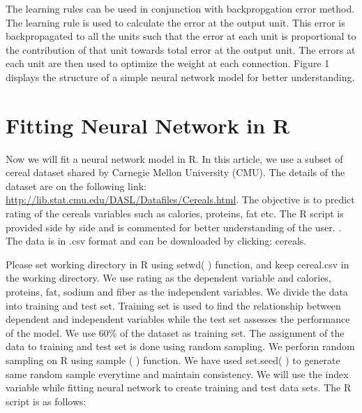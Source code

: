 \documentclass[]{book}
\begin{document}
The learning rules can be used in conjunction with backpropgation error method. The learning rule is used to calculate the error at the output unit. This error is backpropagated to all the units such that the error at each unit is proportional to the contribution of that unit towards total error at the output unit. The errors at each unit are then used to optimize the weight at each connection. Figure 1 displays the structure of a simple neural network model for better understanding.

\hypertarget{fitting-neural-network-in-r}{%
\section{Fitting Neural Network in R}\label{fitting-neural-network-in-r}}

Now we will fit a neural network model in R. In this article, we use a subset of cereal dataset shared by Carnegie Mellon University (CMU). The details of the dataset are on the following link: \url{http://lib.stat.cmu.edu/DASL/Datafiles/Cereals.html}. The objective is to predict rating of the cereals variables such as calories, proteins, fat etc. The R script is provided side by side and is commented for better understanding of the user. . The data is in .csv format and can be downloaded by clicking: cereals.

Please set working directory in R using setwd( ) function, and keep cereal.csv in the working directory. We use rating as the dependent variable and calories, proteins, fat, sodium and fiber as the independent variables. We divide the data into training and test set. Training set is used to find the relationship between dependent and independent variables while the test set assesses the performance of the model. We use 60\% of the dataset as training set. The assignment of the data to training and test set is done using random sampling. We perform random sampling on R using sample ( ) function. We have used set.seed( ) to generate same random sample everytime and maintain consistency. We will use the index variable while fitting neural network to create training and test data sets. The R script is as follows:
\end{document}
